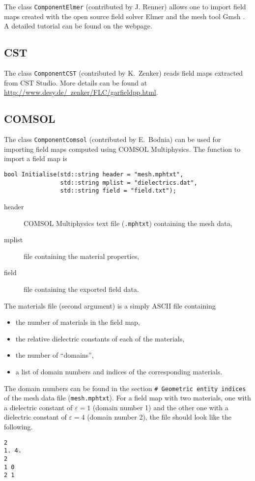 The class \texttt{ComponentElmer} (contributed by J. Renner) allows one to import 
field maps created with the open source field solver Elmer \cite{Elmer}
and the mesh tool Gmsh \cite{Gmsh}. 
A detailed tutorial can be found on the webpage. 

\subsection{CST}

The class \texttt{ComponentCST} (contributed by K.~Zenker) reads field maps 
extracted from CST Studio. More details can be found at 
\href{http://www.desy.de/~zenker/FLC/garfieldpp.html}{http://www.desy.de/~zenker/FLC/garfieldpp.html}.

\subsection{COMSOL}

The class \texttt{ComponentComsol} (contributed by E.~Bodnia) can be used for 
importing field maps computed using COMSOL Multiphysics.
The function to import a field map is 
\begin{lstlisting}
bool Initialise(std::string header = "mesh.mphtxt",
                std::string mplist = "dielectrics.dat",
                std::string field = "field.txt");
\end{lstlisting}
\begin{description}
  \item[header] COMSOL Multiphysics text file (\texttt{.mphtxt}) containing the mesh data,
  \item[mplist] file containing the material properties, 
  \item[field] file containing the exported field data. 
\end{description}
The materials file (second argument) is a simply ASCII file containing
\begin{itemize}
  \item
  the number of materials in the field map, 
  \item
  the relative dielectric constants of each of the materials,
  \item
  the number of ``domains'',
  \item
  a list of domain numbers and indices of the corresponding materials.
\end{itemize}
The domain numbers can be found in the section 
\texttt{\# Geometric entity indices} of the mesh data file 
(\texttt{mesh.mphtxt}).
For a field map with two materials, 
one with a dielectric constant of $\varepsilon = 1$ (domain number 1) and 
the other one with a dielectric constant of $\varepsilon = 4$ 
(domain number 2), the file should look like the following.
\begin{lstlisting}
2
1. 4. 
2
1 0
2 1
\end{lstlisting}


